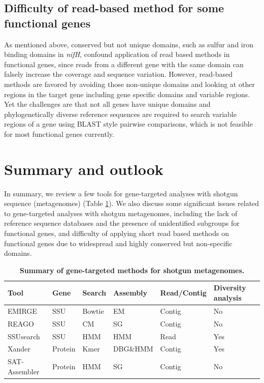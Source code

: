 \documentclass[]{msu-thesis}
\begin{document}
\subsection{Difficulty of read-based method for some functional genes}
As mentioned above, conserved but not unique domains, such as
sulfur and iron binding domains in \textit{nifH}, confound application
of read based methods in functional genes, since reads from a different
gene with the same domain can falsely increase the coverage
and sequence variation. However, read-based
methods are favored by avoiding those non-unique domains and looking
at other regions in the target gene including gene specific domains and
variable regions. Yet the challenges are that not all genes have unique
domains and phylogenetically diverse reference sequences are required to
search variable regions of a gene using BLAST style pairwise
comparisons, which is not feasible for most functional genes currently.

\section{Summary and outlook}

In summary, we review a few tools for gene-targeted analyses with shotgun
sequence (metagenomes) (Table \ref{tab:toolSumm}). We also discuss some
significant issues related to gene-targeted analyses with shotgun
metagenomes, including the lack of reference sequence databases and
the presence of unidentified subgroups for functional genes, and
difficulty of applying short read based methods on functional genes
due to widespread and highly conserved but non-specific domains.

\begin{table}[htbp]
  \centering
  \caption[Summary of gene-targeted methods for shotgun metagenomes]{\textbf{Summary of gene-targeted methods for shotgun metagenomes.}}
    \begin{tabular}{|llllll|}
    \toprule
    Tool  & Gene & Search & Assembly & Read/Contig & Diversity analysis \\
    \midrule
    EMIRGE & SSU & Bowtie & EM    & Contig & No \\
    REAGO & SSU & CM    & SG & Contig & No \\
    SSUsearch & SSU & HMM   & HMM    & Read  & Yes \\
    Xander & Protein & Kmer & DBG\&HMM & Contig & Yes \\
    SAT-Assembler & Protein & HMM   & SG & Contig & No \\
    \bottomrule
    \end{tabular}%
  \label{tab:toolSumm}%
\end{table}%
\end{document}
